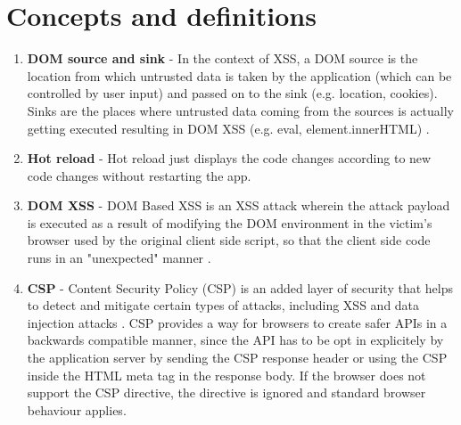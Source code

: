 \chapter*{Concepts and definitions} %
\label{definitions}

\begin{enumerate}
  \item \label{def:dom_source_sink} \textbf{DOM source and sink} - In the context of XSS, a DOM
        source is the location from which untrusted data is taken by the application (which can be
        controlled by user input) and passed on to the sink (e.g. location, cookies). Sinks are the
        places where untrusted data coming from the sources is actually getting executed resulting
        in DOM XSS (e.g. eval, element.innerHTML) \cite{source_sink_definition}.
  \item \label{def:hot_reload} \textbf{Hot reload} - Hot reload just displays the code changes
        according to new code changes without restarting the app.
  \item \label{def:dom_xss} \textbf{DOM XSS} - DOM Based XSS is an XSS attack wherein the attack
        payload is executed as a result of modifying the DOM environment in the victim's browser
        used by the original client side script, so that the client side code runs in an
        "unexpected" manner \cite{owasp_dom_xss_def}.
  \item \label{def:csp} \textbf{CSP} - Content Security Policy (CSP) is an added layer of security
        that helps to detect and mitigate certain types of attacks, including XSS and data injection
        attacks \cite{mdn_csp_def}. CSP provides a way for browsers to create safer APIs in a
        backwards compatible manner, since the API has to be opt in explicitely by the application
        server by sending the CSP response header or using the CSP inside the HTML meta tag in the
        response body. If the browser does not support the CSP directive, the directive is ignored
        and standard browser behaviour applies.
\end{enumerate}
